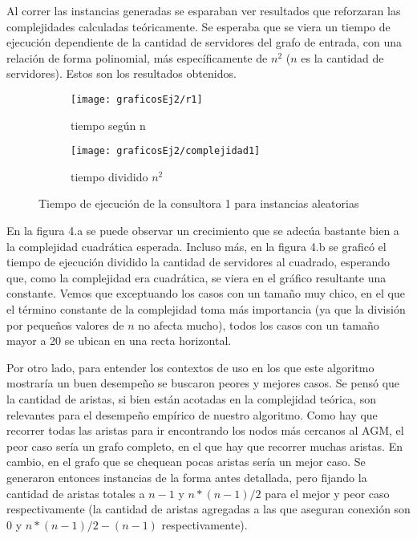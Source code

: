 \documentclass[A4paper,oneside,fleqn,11pt]{article}
\theoremstyle{definition}
\begin{document}
Al correr las instancias generadas se esparaban ver resultados que reforzaran las complejidades calculadas teóricamente. Se esperaba que se viera un tiempo de ejecución dependiente de la cantidad de servidores del grafo de entrada, con una relación de forma polinomial, más específicamente de $n^2$ ($n$ es la cantidad de servidores). Estos son los resultados obtenidos. 

\begin{figure}[H] %
    \begin{subfigure}[b]{0.45\textwidth}
        \texttt{[image: graficosEj2/r1]}
        \caption[center]{tiempo según n}
        \label{ni se pa que sirve esto}
    \end{subfigure}
    \begin{subfigure}[b]{0.45\textwidth}
        \texttt{[image: graficosEj2/complejidad1]}
        \caption{tiempo dividido $n^2$}
        \label{ni se pa que sirve esto}
    \end{subfigure}
    \caption{Tiempo de ejecución de la consultora 1 para instancias aleatorias}
\end{figure}

En la figura 4.a se puede observar un crecimiento que se adecúa bastante bien a la complejidad cuadrática esperada. Incluso más, en la figura 4.b se graficó el tiempo de ejecución dividido la cantidad de servidores al cuadrado, esperando que, como la complejidad era cuadrática, se viera en el gráfico resultante una constante. Vemos que exceptuando los casos con un tamaño muy chico, en el que el término constante de la complejidad toma más importancia (ya que la división por pequeños valores de $n$ no afecta mucho), todos los casos con un tamaño mayor a 20 se ubican en una recta horizontal.

Por otro lado, para entender los contextos de uso en los que este algoritmo mostraría un buen desempeño se buscaron peores y mejores casos. Se pensó que la cantidad de aristas, si bien están acotadas en la complejidad teórica, son relevantes para el desempeño empírico de nuestro algoritmo. Como hay que recorrer todas las aristas para ir encontrando los nodos más cercanos al AGM, el peor caso sería un grafo completo, en el que hay que recorrer muchas aristas. En cambio, en el grafo que se chequean pocas aristas sería un mejor caso. Se generaron entonces instancias de la forma antes detallada, pero fijando la cantidad de aristas totales a $n-1$ y $n*(n-1)/2$ para el mejor y peor caso respectivamente (la cantidad de aristas agregadas a las que aseguran conexión son $0$ y $n*(n-1)/2 - (n-1)$ respectivamente).
\end{document}
